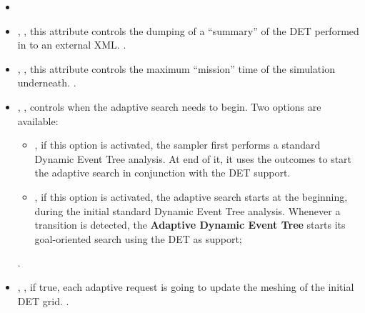 \begin{itemize}
  \itemsep0em
  \item \nameDescription
  \item {}, ,
    this attribute controls the dumping of a ``summary'' of the DET performed in
    to an external XML.
    .
  \item {}, , this
    attribute controls the maximum ``mission'' time of the simulation
    underneath.
    .
  \item {}, , controls when the
    adaptive search needs to begin.
    Two options are available:
    \begin{itemize}
       \item {}, if this option is activated, the sampler first
         performs a standard Dynamic Event Tree analysis. At end of it, it uses
         the outcomes to start the adaptive search in conjunction with the DET
         support.
       \item {}, if this option is activated, the adaptive
         search starts at the beginning, during the initial standard Dynamic
         Event Tree analysis.
         Whenever a transition is detected, the 
         \textbf{Adaptive Dynamic Event Tree} starts its goal-oriented search
         using the DET as support;
    \end{itemize}
      .
  \item {}, , if true, 
    each adaptive request is going to update the meshing of the initial DET
    grid.
    .
\end{itemize}
